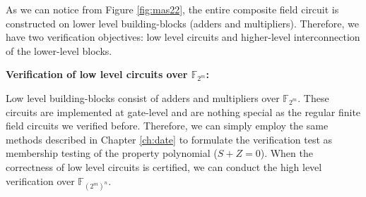 As we can notice from Figure \ref{fig:mas22}, the entire composite field circuit is constructed
on lower level building-blocks (adders and multipliers).
Therefore, we have two verification objectives: low level circuits and
higher-level interconnection of the lower-level blocks.

{\bf Verification of low level circuits over $\mathbb{F}_{2^m}$:}

Low level building-blocks consist of adders and multipliers over $\mathbb{F}_{2^m}$.
These circuits are implemented at gate-level and are nothing special 
as the regular finite field circuits we verified before. 
Therefore, we can simply employ the same methods described in Chapter \ref{ch:date}
to formulate the verification test as membership testing of 
the property polynomial ($S+Z=0$). 
When the correctness of low level circuits is certified, we can conduct the
high level verification over $\mathbb{F}_{(2^m)^n}$.

